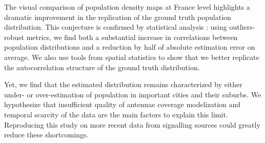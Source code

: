 \documentclass[12pt]{article}
\begin{document}
The visual comparison of population density maps at France level highlights a dramatic improvement in the replication of the ground truth population distribution. This conjecture is confirmed by statistical analysis : using outliers-robust metrics, we find both a substantial increase in correlations between population distributions and a reduction by half of absolute estimation error on average.  We also use tools from spatial statistics to show that we better replicate the autocorrelation structure of the ground truth distribution.

Yet, we find that the estimated distribution remains characterized by either under- or over-estimation of population in important cities and their suburbs. We hypothesize that insufficient quality of antennae coverage modelization and temporal scarcity of the data are the main factors to explain this limit. Reproducing this study on more recent data from signalling sources could greatly reduce these shortcomings.
\end{document}
